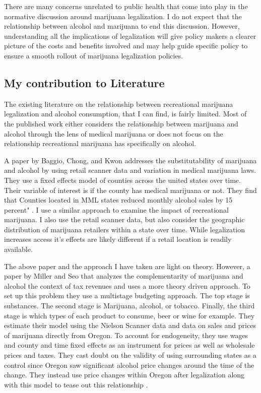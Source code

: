 \documentclass[11pt]{article}
\begin{document}
There are many concerns unrelated to public health that come into play in the normative discussion around marijuana legalization. I do not expect that the relationship between alcohol and marijuana to end this discussion. However, understanding all the implications of legalization will give policy makers a clearer picture of the costs and benefits involved and may help guide specific policy to ensure a smooth rollout of marijuana legalization policies.




\subsection{My contribution to Literature}

The existing literature on the relationship between recreational marijuana legalization and alcohol consumption, that I can find, is fairly limited. Most of the published work either considers the relationship between marijuana and alcohol through the lens of medical marijuana or does not focus on the relationship recreational marijuana has specifically on alcohol.\par 


A paper by Baggio, Chong, and Kwon addresses the substitutability of marijuana and alcohol by using retail scanner data and variation in medical marijuana laws. They use a fixed effects model of counties across the united states over time. Their variable of interest is if the county has medical marijuana or not. They find that Counties located in MML states reduced monthly alcohol sales by 15 percent" \cite{baggio_chong_kwon_2018}. I use a similar approach to examine the impact of recreational marijuana. I also use the retail scanner data, but also consider the geographic distribution of marijuana retailers within a state over time. While legalization increases access it's effects are likely different if a retail location is readily available. \par


The above paper and the approach I have taken are light on theory. However, a paper by Miller and Seo that analyzes the complementarity of marijuana and alcohol  the context of tax revenues and uses a more theory driven approach. To set up this problem they use a multistage budgeting approach. The top stage is substances. The second stage is Marijuana, alcohol, or tobacco. Finally, the third stage is which types of each product to consume, beer or wine for example. They estimate their model using the Nielson Scanner data and data on sales and prices of marijuana directly from Oregon. To account for endogeneity, they use wages and county and time fixed effects as an instrument for prices as well as wholesale prices and taxes.  They cast doubt on the validity of using surrounding states as a control since Oregon saw significant alcohol price changes around the time of the change. They instead use price changes within Oregon after legalization along with this model to tease out this relationship \cite{miller_seo_2018}. \par
\end{document}
